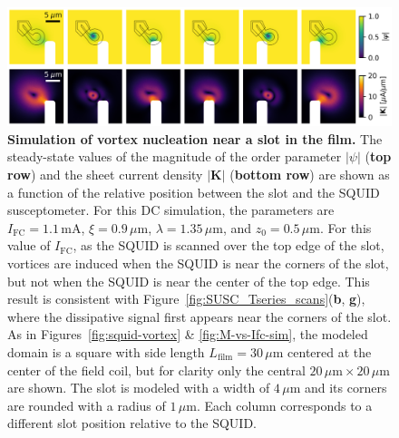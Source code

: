 \documentclass[%
 reprint,
 superscriptaddress,
 amsmath,
 amssymb,
 amsfonts,
 aps,
 prb,
]{revtex4-2}
\newcommand{\mA}{\mathrm{mA}}
\newcommand{\um}{\mu\mathrm{m}}
\begin{document}
\begin{figure}
    \centering
    \includegraphics[width=\linewidth]{figures/squid-slot-top.png}
    \caption{{\bf Simulation of vortex nucleation near a slot in the film.} The steady-state values of the magnitude of the order parameter $|\psi|$ ({\bf top row}) and the sheet current density $|\mathbf{K}|$ ({\bf bottom row}) are shown as a function of the relative position between the slot and the SQUID susceptometer. For this DC simulation, the parameters are $I_\mathrm{FC}=1.1\,\mA$, $\xi=0.9\,\um$, $\lambda=1.35\,\um$, and $z_0=0.5\,\um$. For this value of $I_\mathrm{FC}$, as the SQUID is scanned over the top edge of the slot, vortices are induced when the SQUID is near the corners of the slot, but not when the SQUID is near the center of the top edge. This result is consistent with Figure~\ref{fig:SUSC_Tseries_scans}({\bf b}, {\bf g}), where the dissipative signal first appears near the corners of the slot. As in Figures~\ref{fig:squid-vortex} \& \ref{fig:M-vs-Ifc-sim}, the modeled domain is a square with side length $L_\mathrm{film}=30\,\um$ centered at the center of the field coil, but for clarity only the central $20\,\um\times 20\,\um$ are shown. The slot is modeled with a width of $4\,\um$ and its corners are rounded with a radius of $1\,\um$. Each column corresponds to a different slot position relative to the SQUID.}
    \label{fig:squid-slot-top}
\end{figure}
\end{document}
